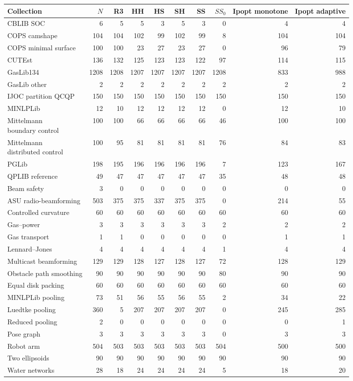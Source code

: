 \begin{tabular}{@{}lrrrrrrrrr@{}}
\toprule
Collection & $N$ & R3 & HH & HS & SH & SS & $SS_0$ & Ipopt monotone & Ipopt adaptive\\
\midrule
CBLIB SOC & 6 & 5 & 5 & 3 & 5 & 3 & 0 & 4 & 4\\
COPS camshape & 104 & 104 & 102 & 99 & 102 & 99 & 8 & 104 & 104\\
COPS minimal surface & 100 & 100 & 23 & 27 & 23 & 27 & 0 & 96 & 79\\
CUTEst & 136 & 132 & 125 & 123 & 123 & 122 & 97 & 114 & 115\\
GasLib134 & 1208 & 1208 & 1207 & 1207 & 1207 & 1207 & 1208 & 833 & 988\\
GasLib other & 2 & 2 & 2 & 2 & 2 & 2 & 2 & 2 & 2\\
IJOC partition QCQP & 150 & 150 & 150 & 150 & 150 & 150 & 150 & 150 & 150\\
MINLPLib & 12 & 10 & 12 & 12 & 12 & 12 & 0 & 12 & 10\\
\shortstack[l]{Mittelmann\\boundary control} & 100 & 100 & 66 & 66 & 66 & 66 & 46 & 100 & 100\\
\shortstack[l]{Mittelmann\\distributed control} & 100 & 95 & 81 & 81 & 81 & 81 & 76 & 84 & 83\\
PGLib & 198 & 195 & 196 & 196 & 196 & 196 & 7 & 123 & 167\\
QPLIB reference & 49 & 47 & 47 & 47 & 47 & 47 & 35 & 48 & 48\\
Beam safety & 3 & 0 & 0 & 0 & 0 & 0 & 0 & 0 & 0\\
ASU radio-beamforming & 503 & 375 & 375 & 337 & 375 & 375 & 0 & 214 & 55\\
Controlled curvature & 60 & 60 & 60 & 60 & 60 & 60 & 60 & 60 & 60\\
Gas--power & 3 & 3 & 3 & 3 & 3 & 3 & 2 & 2 & 2\\
Gas transport & 1 & 1 & 0 & 0 & 0 & 0 & 0 & 1 & 1\\
Lennard--Jones & 4 & 4 & 4 & 4 & 4 & 4 & 1 & 4 & 4\\
Multicast beamforming & 129 & 129 & 128 & 127 & 128 & 127 & 72 & 128 & 129\\
Obstacle path smoothing & 90 & 90 & 90 & 90 & 90 & 90 & 80 & 90 & 90\\
Equal disk packing & 60 & 60 & 60 & 60 & 60 & 60 & 60 & 60 & 60\\
MINLPLib pooling & 73 & 51 & 56 & 55 & 56 & 55 & 2 & 34 & 22\\
Luedtke pooling & 360 & 5 & 207 & 207 & 207 & 207 & 0 & 245 & 285\\
Reduced pooling & 2 & 0 & 0 & 0 & 0 & 0 & 0 & 0 & 1\\
Pose graph & 3 & 3 & 3 & 3 & 3 & 3 & 0 & 3 & 3\\
Robot arm & 504 & 503 & 503 & 503 & 503 & 503 & 504 & 500 & 500\\
Two ellipsoids & 90 & 90 & 90 & 90 & 90 & 90 & 90 & 90 & 90\\
Water networks & 28 & 18 & 24 & 24 & 24 & 24 & 5 & 18 & 20\\
\bottomrule
\end{tabular}
